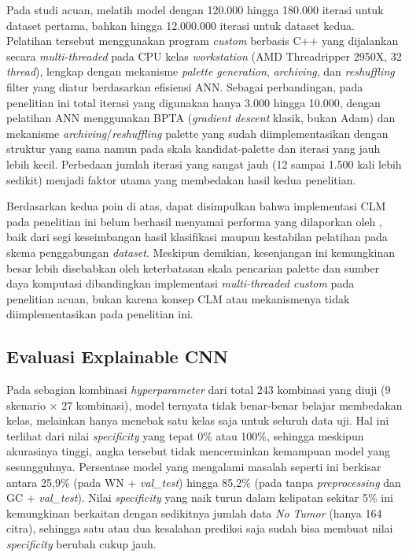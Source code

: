 Pada studi acuan, \textcite{wozniak2021deep} melatih model dengan 120.000 hingga 180.000 iterasi untuk dataset pertama, bahkan hingga 12.000.000 iterasi untuk dataset kedua. Pelatihan tersebut menggunakan program \textit{custom} berbasis C++ yang dijalankan secara \textit{multi-threaded} pada CPU kelas \textit{workstation} (AMD Threadripper 2950X, 32 \textit{thread}), lengkap dengan mekanisme \textit{palette generation}, \textit{archiving}, dan \textit{reshuffling} filter yang diatur berdasarkan efisiensi ANN. Sebagai perbandingan, pada penelitian ini total iterasi yang digunakan hanya 3.000 hingga 10.000, dengan pelatihan ANN menggunakan BPTA (\textit{gradient descent} klasik, bukan Adam) dan mekanisme \textit{archiving}/\textit{reshuffling} palette yang sudah diimplementasikan dengan struktur yang sama namun pada skala kandidat-palette dan iterasi yang jauh lebih kecil. Perbedaan jumlah iterasi yang sangat jauh (12 sampai 1.500 kali lebih sedikit) menjadi faktor utama yang membedakan hasil kedua penelitian.

Berdasarkan kedua poin di atas, dapat disimpulkan bahwa implementasi CLM pada penelitian ini belum berhasil menyamai performa yang dilaporkan oleh \textcite{wozniak2021deep}, baik dari segi keseimbangan hasil klasifikasi maupun kestabilan pelatihan pada skema penggabungan \textit{dataset}. Meskipun demikian, kesenjangan ini kemungkinan besar lebih disebabkan oleh keterbatasan skala pencarian palette dan sumber daya komputasi dibandingkan implementasi \textit{multi-threaded custom} pada penelitian acuan, bukan karena konsep CLM atau mekanismenya tidak diimplementasikan pada penelitian ini.

\subsection{Evaluasi Explainable CNN}
\label{subsec:excnn}

Pada sebagian kombinasi \textit{hyperparameter} dari total 243 kombinasi yang diuji (9 skenario $\times$ 27 kombinasi), model ternyata tidak benar-benar belajar membedakan kelas, melainkan hanya menebak satu kelas saja untuk seluruh data uji. Hal ini terlihat dari nilai \textit{specificity} yang tepat 0\% atau 100\%, sehingga meskipun akurasinya tinggi, angka tersebut tidak mencerminkan kemampuan model yang sesungguhnya. Persentase model yang mengalami masalah seperti ini berkisar antara 25,9\% (pada WN + \textit{val\_test}) hingga 85,2\% (pada tanpa \textit{preprocessing} dan GC + \textit{val\_test}). Nilai \textit{specificity} yang naik turun dalam kelipatan sekitar 5\% ini kemungkinan berkaitan dengan sedikitnya jumlah data \textit{No Tumor} (hanya 164 citra), sehingga satu atau dua kesalahan prediksi saja sudah bisa membuat nilai \textit{specificity} berubah cukup jauh.

